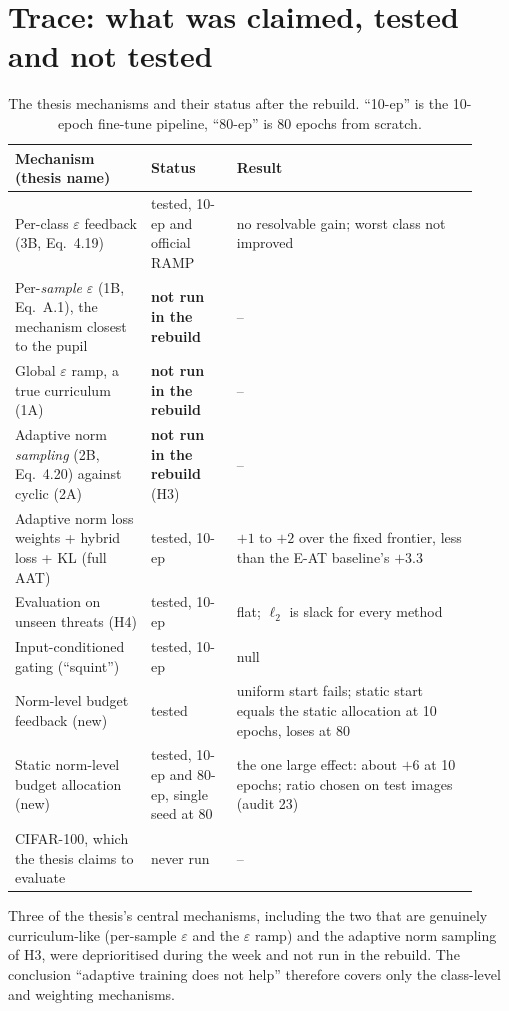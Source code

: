 \documentclass[11pt]{article}
\begin{document}
\section{Trace: what was claimed, tested and not tested}
\begin{table}[h]\centering\small
\caption{The thesis mechanisms and their status after the rebuild. ``10-ep'' is the 10-epoch fine-tune pipeline, ``80-ep'' is 80 epochs from scratch.}
\begin{tabular}{p{0.27\linewidth}p{0.17\linewidth}p{0.48\linewidth}}\toprule
Mechanism (thesis name) & Status & Result\\\midrule
Per-class $\varepsilon$ feedback (3B, Eq.~4.19) & tested, 10-ep and official RAMP & no resolvable gain; worst class not improved\\
Per-\emph{sample} $\varepsilon$ (1B, Eq.~A.1), the mechanism closest to the pupil & \textbf{not run in the rebuild} & --\\
Global $\varepsilon$ ramp, a true curriculum (1A) & \textbf{not run in the rebuild} & --\\
Adaptive norm \emph{sampling} (2B, Eq.~4.20) against cyclic (2A) & \textbf{not run in the rebuild} (H3) & --\\
Adaptive norm loss weights + hybrid loss + KL (full AAT) & tested, 10-ep & $+1$ to $+2$ over the fixed frontier, less than the E-AT baseline's $+3.3$\\
Evaluation on unseen threats (H4) & tested, 10-ep & flat; $\ell_2$ is slack for every method\\
Input-conditioned gating (``squint'') & tested, 10-ep & null\\
Norm-level budget feedback (new) & tested & uniform start fails; static start equals the static allocation at 10 epochs, loses at 80\\
Static norm-level budget allocation (new) & tested, 10-ep and 80-ep, single seed at 80 & the one large effect: about $+6$ at 10 epochs; ratio chosen on test images (audit 23)\\
CIFAR-100, which the thesis claims to evaluate & never run & --\\\bottomrule
\end{tabular}
\end{table}
Three of the thesis's central mechanisms, including the two that are genuinely curriculum-like (per-sample $\varepsilon$ and the $\varepsilon$ ramp) and the adaptive norm sampling of H3, were deprioritised during the week and not run in the rebuild. The conclusion ``adaptive training does not help'' therefore covers only the class-level and weighting mechanisms.
\end{document}
